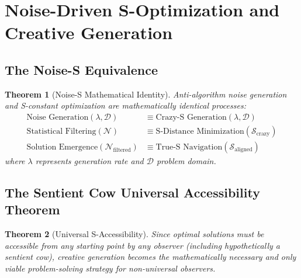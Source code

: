 \documentclass[12pt,a4paper]{article}
\newtheorem{theorem}{Theorem}[section]
\begin{document}
\section{Noise-Driven S-Optimization and Creative Generation}

\subsection{The Noise-S Equivalence}

\begin{theorem}[Noise-S Mathematical Identity]
Anti-algorithm noise generation and S-constant optimization are mathematically identical processes:
\begin{align}
\text{Noise Generation}(\lambda, \mathcal{D}) &\equiv \text{Crazy-S Generation}(\lambda, \mathcal{D}) \\
\text{Statistical Filtering}(\mathcal{N}) &\equiv \text{S-Distance Minimization}(\mathcal{S}_{\text{crazy}}) \\
\text{Solution Emergence}(\mathcal{N}_{\text{filtered}}) &\equiv \text{True-S Navigation}(\mathcal{S}_{\text{aligned}})
\end{align}
where $\lambda$ represents generation rate and $\mathcal{D}$ problem domain.
\end{theorem}

\subsection{The Sentient Cow Universal Accessibility Theorem}

\begin{theorem}[Universal S-Accessibility]
Since optimal solutions must be accessible from any starting point by any observer (including hypothetically a sentient cow), creative generation becomes the mathematically necessary and only viable problem-solving strategy for non-universal observers.
\end{theorem}
\end{document}
